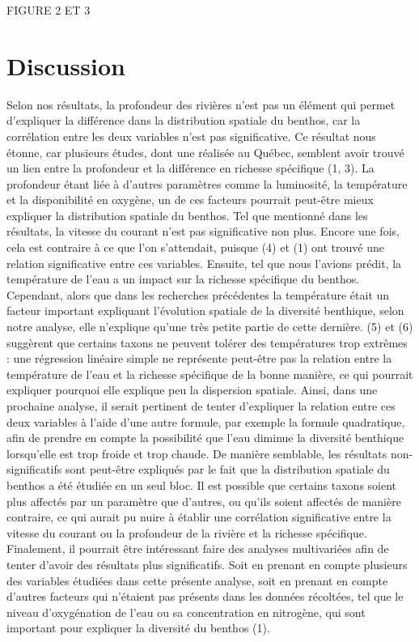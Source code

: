 \documentclass[9pt,twocolumn,twoside,]{pnas-new}
\begin{document}
FIGURE 2 ET 3

\section{Discussion}\label{discussion}

Selon nos résultats, la profondeur des rivières n'est pas un élément qui
permet d'expliquer la différence dans la distribution spatiale du
benthos, car la corrélation entre les deux variables n'est pas
significative. Ce résultat nous étonne, car plusieurs études, dont une
réalisée au Québec, semblent avoir trouvé un lien entre la profondeur et
la différence en richesse spécifique (1, 3). La profondeur étant liée à
d'autres paramètres comme la luminosité, la température et la
disponibilité en oxygène, un de ces facteurs pourrait peut-être mieux
expliquer la distribution spatiale du benthos. Tel que mentionné dans
les résultats, la vitesse du courant n'est pas significative non plus.
Encore une fois, cela est contraire à ce que l'on s'attendait, puisque
(4) et (1) ont trouvé une relation significative entre ces variables.
Ensuite, tel que nous l'avions prédit, la température de l'eau a un
impact sur la richesse spécifique du benthos. Cependant, alors que dans
les recherches précédentes la température était un facteur important
expliquant l'évolution spatiale de la diversité benthique, selon notre
analyse, elle n'explique qu'une très petite partie de cette dernière.
(5) et (6) suggèrent que certains taxons ne peuvent tolérer des
températures trop extrêmes : une régression linéaire simple ne
représente peut-être pas la relation entre la température de l'eau et la
richesse spécifique de la bonne manière, ce qui pourrait expliquer
pourquoi elle explique peu la dispersion spatiale. Ainsi, dans une
prochaine analyse, il serait pertinent de tenter d'expliquer la relation
entre ces deux variables à l'aide d'une autre formule, par exemple la
formule quadratique, afin de prendre en compte la possibilité que l'eau
diminue la diversité benthique lorsqu'elle est trop froide et trop
chaude. De manière semblable, les résultats non-significatifs sont
peut-être expliqués par le fait que la distribution spatiale du benthos
a été étudiée en un seul bloc. Il est possible que certains taxons
soient plus affectés par un paramètre que d'autres, ou qu'ils soient
affectés de manière contraire, ce qui aurait pu nuire à établir une
corrélation significative entre la vitesse du courant ou la profondeur
de la rivière et la richesse spécifique. Finalement, il pourrait être
intéressant faire des analyses multivariées afin de tenter d'avoir des
résultats plus significatifs. Soit en prenant en compte plusieurs des
variables étudiées dans cette présente analyse, soit en prenant en
compte d'autres facteurs qui n'étaient pas présents dans les données
récoltées, tel que le niveau d'oxygénation de l'eau ou sa concentration
en nitrogène, qui sont important pour expliquer la diversité du benthos
(1).
\end{document}
